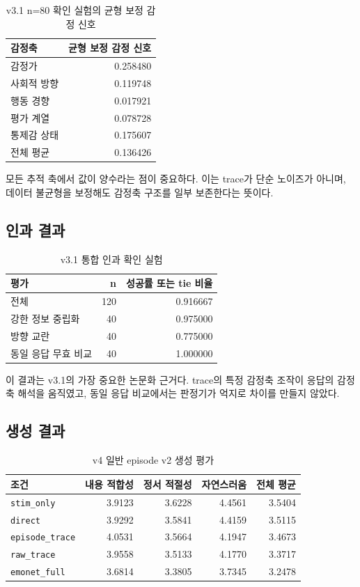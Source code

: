 \documentclass[11pt,a4paper]{article}
\newcommand{\eng}[1]{\texttt{#1}}
\begin{document}
\begin{table}[h]
\centering
\caption{v3.1 n=80 확인 실험의 균형 보정 감정 신호}
\begin{tabular}{lr}
\toprule
감정축 & 균형 보정 감정 신호 \\
\midrule
감정가 & 0.258480 \\
사회적 방향 & 0.119748 \\
행동 경향 & 0.017921 \\
평가 계열 & 0.078728 \\
통제감 상태 & 0.175607 \\
\midrule
전체 평균 & 0.136426 \\
\bottomrule
\end{tabular}
\end{table}

모든 추적 축에서 값이 양수라는 점이 중요하다. 이는 trace가 단순 노이즈가 아니며, 데이터 불균형을 보정해도 감정축 구조를 일부 보존한다는 뜻이다.

\subsection{인과 결과}

\begin{table}[h]
\centering
\caption{v3.1 통합 인과 확인 실험}
\begin{tabular}{lrr}
\toprule
평가 & n & 성공률 또는 tie 비율 \\
\midrule
전체 & 120 & 0.916667 \\
강한 정보 중립화 & 40 & 0.975000 \\
방향 교란 & 40 & 0.775000 \\
동일 응답 무효 비교 & 40 & 1.000000 \\
\bottomrule
\end{tabular}
\end{table}

이 결과는 v3.1의 가장 중요한 논문화 근거다. trace의 특정 감정축 조작이 응답의 감정축 해석을 움직였고, 동일 응답 비교에서는 판정기가 억지로 차이를 만들지 않았다.

\subsection{생성 결과}

\begin{table}[h]
\centering
\caption{v4 일반 episode v2 생성 평가}
\begin{tabularx}{\linewidth}{lrrrr}
\toprule
조건 & 내용 적합성 & 정서 적절성 & 자연스러움 & 전체 평균 \\
\midrule
\eng{stim\_only} & 3.9123 & 3.6228 & 4.4561 & 3.5404 \\
\eng{direct} & 3.9292 & 3.5841 & 4.4159 & 3.5115 \\
\eng{episode\_trace} & 4.0531 & 3.5664 & 4.1947 & 3.4673 \\
\eng{raw\_trace} & 3.9558 & 3.5133 & 4.1770 & 3.3717 \\
\eng{emonet\_full} & 3.6814 & 3.3805 & 3.7345 & 3.2478 \\
\bottomrule
\end{tabularx}
\end{table}
\end{document}
